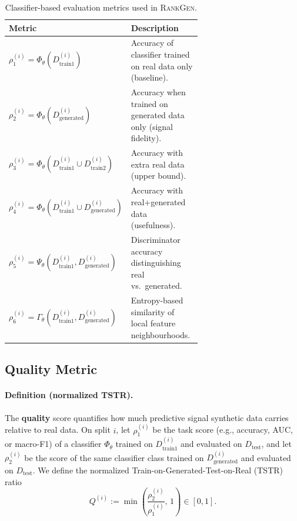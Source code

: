 \begin{table}[H]
\centering
\caption{Classifier-based evaluation metrics used in \textsc{RankGen}.}
\label{tab:classifier-metrics}
\begin{small}
\begin{tabular}{@{}l p{0.65\linewidth}@{}}  %
\toprule
\textbf{Metric} & \textbf{Description} \\
\midrule
$\rho_1^{(i)} = \Phi_{\theta}(D_{\text{train1}}^{(i)})$ & Accuracy of classifier trained on real data only (baseline). \\
$\rho_2^{(i)} = \Phi_{\theta}(D_{\text{generated}}^{(i)})$ & Accuracy when trained on generated data only (signal fidelity). \\
$\rho_3^{(i)} = \Phi_{\theta}(D_{\text{train1}}^{(i)} \cup D_{\text{train2}}^{(i)})$ & Accuracy with extra real data (upper bound). \\
$\rho_4^{(i)} = \Phi_{\theta}(D_{\text{train1}}^{(i)} \cup D_{\text{generated}}^{(i)})$ & Accuracy with real+generated data (usefulness). \\
$\rho_5^{(i)} = \Psi_{\theta}(D_{\text{train1}}^{(i)}, D_{\text{generated}}^{(i)})$ & Discriminator accuracy distinguishing real vs.\ generated. \\
$\rho_6^{(i)} = \Gamma_{\theta}(D_{\text{train1}}^{(i)}, D_{\text{generated}}^{(i)})$ & Entropy-based similarity of local feature neighbourhoods. \\
\bottomrule
\end{tabular}
\end{small}
\end{table}



\subsection{Quality Metric}
\label{sec:quality}

\paragraph{Definition (normalized TSTR).}
The \textbf{quality} score quantifies how much predictive signal synthetic data
carries relative to real data. On split $i$, let $\rho^{(i)}_1$ be the task
score (e.g., accuracy, AUC, or macro-F1) of a classifier $\Phi_\theta$ trained
on $D^{(i)}_{\text{train1}}$ and evaluated on $D_{\text{test}}$, and let
$\rho^{(i)}_2$ be the score of the same classifier class trained on
$D^{(i)}_{\text{generated}}$ and evaluated on $D_{\text{test}}$. We define the
normalized Train-on-Generated-Test-on-Real (TSTR) ratio
\[
Q^{(i)} := \min\!\left(\frac{\rho^{(i)}_2}{\rho^{(i)}_1},\,1\right)\in[0,1].
\]

